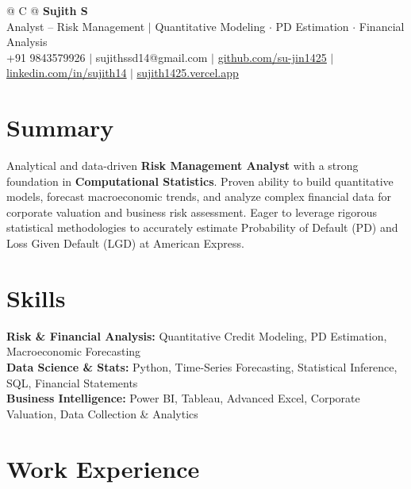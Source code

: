 \documentclass[a4paper,10pt]{article}
\newcommand{\ulink}[2]{\href{#1}{\uline{#2}}}
\begin{document}
\pagestyle{empty}

\begin{tabularx}{\linewidth}{@{} C @{}}
{\color[HTML]{000000}\fontsize{30}{35}\selectfont\bfseries Sujith S} \\[5pt]
{\fontsize{10.5}{12.5}\selectfont\color[HTML]{3A3A3A}
Analyst -- Risk Management $|$ Quantitative Modeling $\cdot$ PD Estimation $\cdot$ Financial Analysis} \\[6pt]
{\fontsize{9.5}{11.5}\selectfont\textcolor[HTML]{3A3A3A}{+91 9843579926 $|$ sujithssd14@gmail.com $|$ \ulink{https://github.com/su-jin1425}{github.com/su-jin1425} $|$ \ulink{https://linkedin.com/in/sujith14}{linkedin.com/in/sujith14} $|$ \ulink{https://sujith1425.vercel.app}{sujith1425.vercel.app}}}
\end{tabularx}



\section{Summary}

{\color[HTML]{0A0A0A}\fontsize{11}{14}\selectfont
Analytical and data-driven \textbf{Risk Management Analyst} with a strong foundation in \textbf{Computational Statistics}. Proven ability to build quantitative models, forecast macroeconomic trends, and analyze complex financial data for corporate valuation and business risk assessment. Eager to leverage rigorous statistical methodologies to accurately estimate Probability of Default (PD) and Loss Given Default (LGD) at American Express.}



\section{Skills}

{\color[HTML]{0A0A0A}\fontsize{11}{14}\selectfont
\textbf{Risk \& Financial Analysis:} Quantitative Credit Modeling, PD Estimation, Macroeconomic Forecasting \\[2pt]
\textbf{Data Science \& Stats:} Python, Time-Series Forecasting, Statistical Inference, SQL, Financial Statements \\[2pt]
\textbf{Business Intelligence:} Power BI, Tableau, Advanced Excel, Corporate Valuation, Data Collection \& Analytics}



\section{Work Experience}
\end{document}
